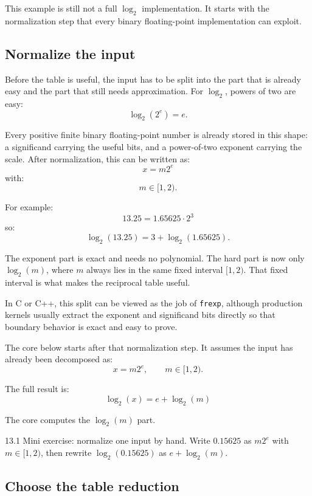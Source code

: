 \documentclass[manuscript, nonacm]{acmart}
\begin{document}
    This example is still not a full $\log_2$ implementation. It starts with the
    normalization step that every binary floating-point implementation can exploit.

    \subsection{Normalize the input}

    Before the table is useful, the input has to be split into the part that is
    already easy and the part that still needs approximation. For $\log_2$, powers
    of two are easy:
    \[ \log_2(2^e) = e. \]

    Every positive finite binary floating-point number is already stored in this
    shape: a significand carrying the useful bits, and a power-of-two exponent
    carrying the scale. After normalization, this can be written as:
    \[ x = m 2^e \]
    with:
    \[ m \in [1, 2). \]

    For example:
    \[ 13.25 = 1.65625 \cdot 2^3 \]
    so:
    \[ \log_2(13.25) = 3 + \log_2(1.65625). \]

    The exponent part is exact and needs no polynomial. The hard part is now only
    $\log_2(m)$, where $m$ always lies in the same fixed interval $[1,2)$. That
    fixed interval is what makes the reciprocal table useful.

    In C or C++, this split can be viewed as the job of \texttt{frexp}, although
    production kernels usually extract the exponent and significand bits directly
    so that boundary behavior is exact and easy to prove.

    The core below starts after that normalization step. It assumes the input has
    already been decomposed as:
    \[ x = m 2^e, \qquad m \in [1, 2). \]

    The full result is:
    \[ \log_2(x) = e + \log_2(m) \]

    The core computes the $\log_2(m)$ part.


    \begin{checkpoint}{13.1}
        Mini exercise: normalize one input by hand. Write $0.15625$ as
        $m2^e$ with $m \in [1,2)$, then rewrite $\log_2(0.15625)$ as
        $e + \log_2(m)$.
    \end{checkpoint}

    \subsection{Choose the table reduction}
\end{document}
